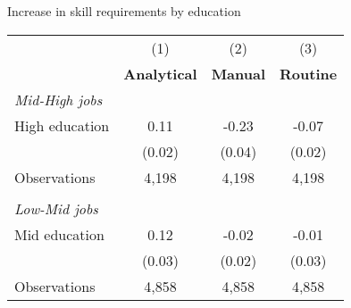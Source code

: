 \begin{center}
\begin{threeparttable}[!h]
\caption{Increase in skill requirements by education}
\label{tab:skillRegs}
\begin{tabular}{lccc}
\toprule
\toprule
&\multicolumn{1}{c}{(1)}&\multicolumn{1}{c}{(2)}&\multicolumn{1}{c}{(3)} \\
\textbf{}&\multicolumn{1}{c}{\textbf{Analytical}}&\multicolumn{1}{c}{\textbf{Manual}}&\multicolumn{1}{c}{\textbf{Routine}} \\
\midrule
\textit{Mid-High jobs } \\ 
High education      &        0.11\sym{***}&       -0.23\sym{***}&       -0.07\sym{**} \\
                    &      (0.02)         &      (0.04)         &      (0.02)         \\
\midrule Observations&       4,198         &       4,198         &       4,198         \\
\\
\textit{Low-Mid jobs  } \\
Mid education       &        0.12\sym{***}&       -0.02         &       -0.01         \\
                    &      (0.03)         &      (0.02)         &      (0.03)         \\
\midrule Observations&       4,858         &       4,858         &       4,858         \\
\bottomrule
\bottomrule
\end{tabular}
\end{threeparttable}
\end{center}
